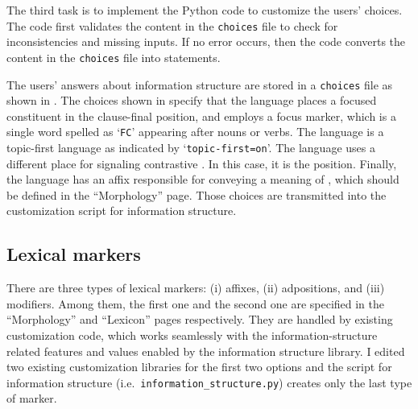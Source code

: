 The third task is to implement the Python code to customize the users'
choices. The code first validates the content in the \texttt{choices}
file to check for inconsistencies and missing inputs. If no error
occurs, then the code converts the content in the \texttt{choices}
file into  statements.




The users' answers about information structure are stored in a
\texttt{choices} file as shown in . The
choices shown in  specify that the language
places a focused constituent in the clause-final
position, and employs a focus marker, which is a
single word spelled as `\texttt{FC}' appearing after nouns or
verbs. The language is a topic-first language as indicated by
`\texttt{topic-first=on}'. The language uses a different place for
signaling contrastive . In this case, it is the
 position. Finally, the language has an affix
responsible for conveying a meaning of , which
should be defined in the ``Morphology'' page.  Those choices are
transmitted into the customization script for information structure.




\subsection{Lexical markers}
\label{11:ssec:lex}

There are three types of lexical markers: (i) affixes, (ii)
adpositions, and (iii) modifiers. Among them, the
first one and the second one are specified in the ``Morphology'' and
``Lexicon'' pages respectively.  They are handled by existing
customization code, which works seamlessly with the
information-structure related features and values enabled by the
information structure library.  I edited two existing customization
libraries for the first two options and the script for information
structure (i.e.\ \texttt{information{\_}structure.py}) creates only
the last type of marker.






